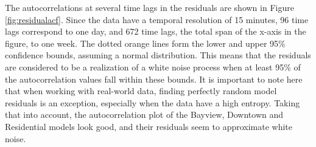 \documentclass[12pt,oneside]{reedthesis}
\begin{document}
The autocorrelations at several time lags in the residuals are shown in
Figure \ref{fig:residualacf}. Since the data have a temporal resolution
of 15 minutes, 96 time lags correspond to one day, and 672 time lags,
the total span of the x-axis in the figure, to one week. The dotted
orange lines form the lower and upper 95\% confidence bounds, assuming a
normal distribution. This means that the residuals are considered to be
a realization of a white noise process when at least 95\% of the
autocorrelation values fall within these bounds. It is important to note
here that when working with real-world data, finding perfectly random
model residuals is an exception, especially when the data have a high
entropy. Taking that into account, the autocorrelation plot of the
Bayview, Downtown and Residential models look good, and their residuals
seem to approximate white noise.
\end{document}
